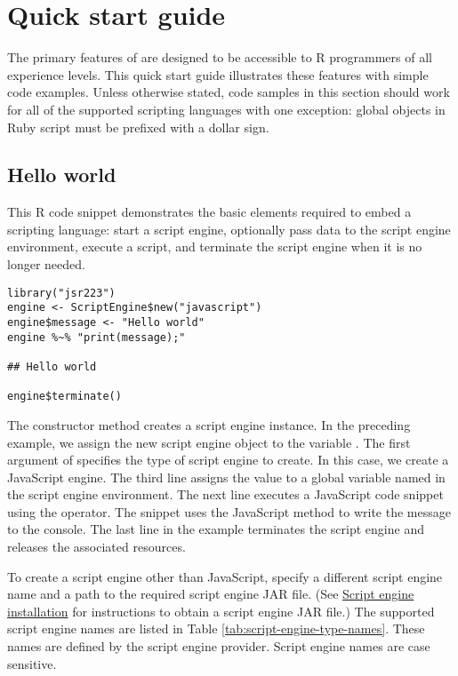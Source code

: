 \hypertarget{quickstartguide}{\section{Quick start guide}}

The primary features of  are designed to be accessible to R programmers of all experience levels. This quick start guide illustrates these features with simple code examples. Unless otherwise stated, code samples in this section should work for all of the supported scripting languages with one exception: global objects in Ruby script must be prefixed with a dollar sign.

\subsection{Hello world}

This R code snippet demonstrates the basic elements required to embed a scripting language: start a script engine, optionally pass data to the script engine environment, execute a script, and terminate the script engine when it is no longer needed.

\begin{verbatim}
library("jsr223")
engine <- ScriptEngine$new("javascript")
engine$message <- "Hello world"
engine %~% "print(message);"

## Hello world

engine$terminate()
\end{verbatim}

The  constructor method creates a script engine instance. In the preceding example, we assign the new script engine object to the variable . The first argument of  specifies the type of script engine to create. In this case, we create a JavaScript engine. The third line assigns the value  to a global variable named  in the script engine environment. The next line executes a JavaScript code snippet using the \code{\%$\sim$\%} operator. The snippet uses the JavaScript  method to write the message to the console. The last line in the example terminates the script engine and releases the associated resources.

To create a script engine other than JavaScript, specify a different script engine name and a path to the required script engine JAR file. (See \hyperlink{scriptengineinstallation}{Script engine installation} for instructions to obtain a script engine JAR file.) The supported script engine names are listed in Table \ref{tab:script-engine-type-names}. These names are defined by the script engine provider.  Script engine names are case sensitive.

